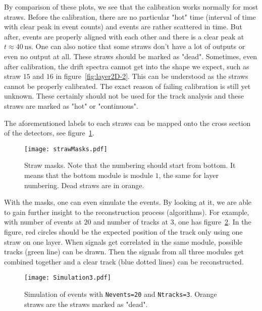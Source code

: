 \clearpage
By comparison of these plots, we see that the calibration works normally for most straws. Before the calibration, there are no particular "hot" time (interval of time with clear peak in event counts) and events are rather scattered in time. But after, events are properly aligned with each other and there is a clear peak at $t\approx\SI{40}{\nano\second}$. One can also notice that some straws don't have a lot of outputs or even no output at all. These straws should be marked as "dead". Sometimes, even after calibration, the drift spectra cannot get into the shape we expect, such as straw $15$ and $16$ in figure~\ref{fig:layer2D-2}. This can be understood as the straws cannot be properly calibrated. The exact reason of failing calibration is still yet unknown. These certainly should not be used for the track analysis and these straws are marked as "hot" or "continuous". 

The aforementioned labels to each straws can be mapped onto the cross section of the detectors, see figure~\ref{fig:strawMasks}.
\begin{figure}[ht]
	\centering
	\texttt{[image: strawMasks.pdf]}
	\caption{Straw masks. Note that the numbering should start from bottom. It means that the bottom module is module $1$, the same for layer numbering. Dead straws are in orange.}%
	\label{fig:strawMasks}
\end{figure}

With the masks, one can even simulate the events. By looking at it, we are able to gain further insight to the reconstruction process (algorithms). For example, with number of events at $20$ and number of tracks at $3$, one has figure~\ref{fig:simu}. In the figure, red circles should be the expected position of the track only using one straw on one layer. When signals get correlated in the same module, possible tracks (green line) can be drawn. Then the signals from all three modules get combined together and a clear track (blue dotted lines) can be reconstructed.
\begin{figure}[ht]
	\centering
	\texttt{[image: Simulation3.pdf]}
	\cprotect\caption{Simulation of events with \verb|Nevents=20| and \verb|Ntracks=3|. Orange straws are the straws marked as "dead".}%
	\label{fig:simu}
\end{figure}

